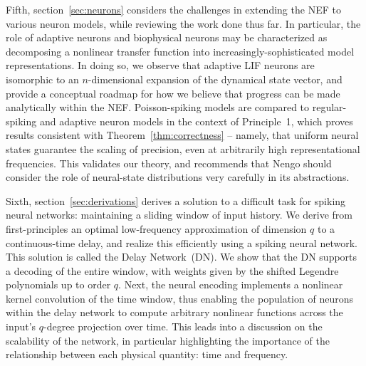 Fifth, section~\ref{sec:neurons} considers the challenges in extending the NEF to various neuron models, while reviewing the work done thus far.
In particular, the role of adaptive neurons and biophysical neurons may be characterized as decomposing a nonlinear transfer function into increasingly-sophisticated model representations.
In doing so, we observe that adaptive LIF neurons are isomorphic to an $n$-dimensional expansion of the dynamical state vector, and provide a conceptual roadmap for how we believe that progress can be made analytically within the NEF.
Poisson-spiking models are compared to regular-spiking and adaptive neuron models in the context of Principle~1, which proves results consistent with Theorem~\ref{thm:correctness} -- namely, that uniform neural states guarantee the scaling of precision, even at arbitrarily high representational frequencies.
This validates our theory, and recommends that Nengo should consider the role of neural-state distributions very carefully in its abstractions.

Sixth, section~\ref{sec:derivations} derives a solution to a difficult task for spiking neural networks: maintaining a sliding window of input history.
We derive from first-principles an optimal low-frequency approximation of dimension $q$ to a continuous-time delay, and realize this efficiently using a spiking neural network.
This solution is called the Delay Network~(DN).
We show that the DN supports a decoding of the entire window, with weights given by the shifted Legendre polynomials up to order $q$.
Next, the neural encoding implements a nonlinear kernel convolution of the time window, thus enabling the population of neurons within the delay network to compute arbitrary nonlinear functions across the input's $q$-degree projection over time.
This leads into a discussion on the scalability of the network, in particular highlighting the importance of the relationship between each physical quantity: time and frequency.

